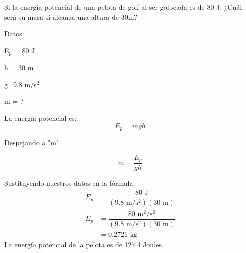 \question[10] Si la energía potencial de una pelota de golf al ser golpeada es de 80 J. ¿Cuál será su masa si alcanza una altura de 30m?

\begin{solutionbox}{7.5cm}
    \begin{multicols}{2}
        Datos:

        E$_p$ = 80 J

        h = 30 m

        g=9.8 m/s$^2$

        m = ?

        La energía potencial es:
        \[E_p=mgh\]

        \vspace{2cm}

        Despejando a "m"

        \[m=\dfrac{E_p}{gh}\]


        Sustituyendo nuestros datos en la fórmula:
        \[
            \begin{array}{rl}
                E_p & = \dfrac{80 \text{ J}}{(9.8 \text{ m/s$^2$})(30 \text{ m})}           \\[1em]
                E_p & = \dfrac{80 \text{ m$^2$/s$^2$}}{(9.8 \text{ m/s$^2$})(30 \text{ m})} \\[1em]
                    & =0.2721 \text{ kg }
            \end{array}
        \]
        La energía potencial de la pelota es de 127.4 Joules.
    \end{multicols}
\end{solutionbox}
